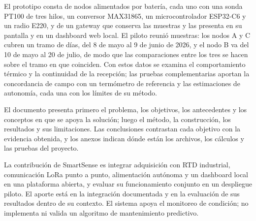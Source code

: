 El prototipo consta de \NumeroNodos{} nodos alimentados por batería, cada uno con una sonda PT100 de tres hilos, un conversor MAX31865, un microcontrolador ESP32-C6 y un radio E220, y de un gateway que conserva las muestras y las presenta en su pantalla y en un dashboard web local. El piloto reunió \TotalMuestras{} muestras: los nodos A y C cubren un tramo de \DuracionComunDias{} días, del 8 de mayo al 9 de junio de 2026, y el nodo B va del 10 de mayo al 20 de julio, de modo que las comparaciones entre los tres se hacen sobre el tramo en que coinciden. Con estos datos se examina el comportamiento térmico y la continuidad de la recepción; las pruebas complementarias aportan la concordancia de campo con un termómetro de referencia y las estimaciones de autonomía, cada una con los límites de su método.

El documento presenta primero el problema, los objetivos, los antecedentes y los conceptos en que se apoya la solución; luego el método, la construcción, los resultados y sus limitaciones. Las conclusiones contrastan cada objetivo con la evidencia obtenida, y los anexos indican dónde están los archivos, los cálculos y las pruebas del proyecto.

La contribución de SmartSense es integrar adquisición con RTD industrial, comunicación LoRa punto a punto, alimentación autónoma y un dashboard local en una plataforma abierta, y evaluar su funcionamiento conjunto en un despliegue piloto. El aporte está en la integración documentada y en la evaluación de sus resultados dentro de su contexto. El sistema apoya el monitoreo de condición; no implementa ni valida un algoritmo de mantenimiento predictivo.
